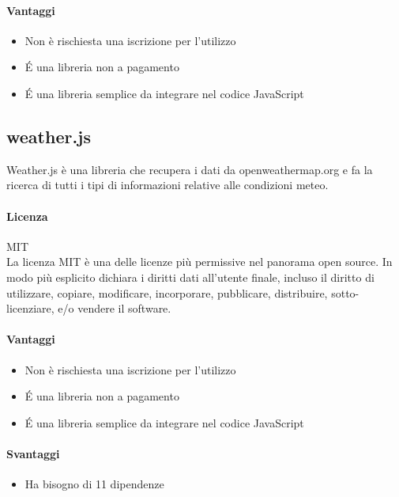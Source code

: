 \paragraph{Vantaggi}
\begin{itemize}
	\item Non è rischiesta una iscrizione per l'utilizzo
	\item \'E una libreria non a pagamento
	\item \'E una libreria semplice da integrare nel codice JavaScript
\end{itemize}


\subsection{weather.js}

Weather.js è una libreria che recupera i dati da openweathermap.org e
fa la ricerca di tutti i tipi di informazioni relative alle condizioni
meteo. 

\paragraph{Licenza} MIT \\
La licenza MIT è una delle licenze più permissive nel panorama open
source. In modo più esplicito dichiara i diritti dati all'utente
finale, incluso il diritto di utilizzare, copiare, modificare,
incorporare, pubblicare, distribuire, sotto-licenziare, e/o vendere il
software. \\

\paragraph{Vantaggi}
\begin{itemize}
	\item Non è rischiesta una iscrizione per l'utilizzo
	\item \'E una libreria non a pagamento
	\item \'E una libreria semplice da integrare nel codice JavaScript
\end{itemize}

\paragraph{Svantaggi} 
\begin{itemize}
	\item Ha bisogno di 11 dipendenze 
\end{itemize}


